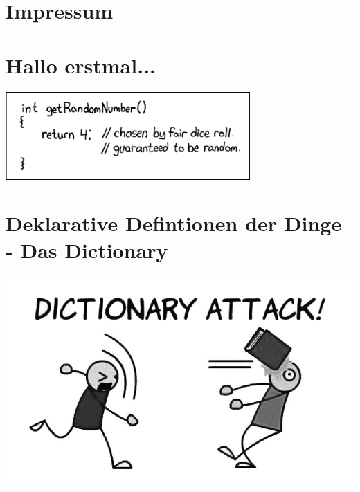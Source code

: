\documentclass[12pt,a4paper]{scrartcl}
\begin{document}


\setcounter{tocdepth}{2} %
\tableofcontents

\newpage



\section{Impressum}

\newpage

\section{Hallo erstmal...}


    \includegraphics[width=0.7\textwidth]{comics/random_number.png}
\newpage

\label{glossar}
\section{Deklarative Defintionen der Dinge - Das Dictionary}

\begin{center}
	\includegraphics[scale=0.5]{comics/dictionary-attack}
\end{center}
\end{document}
